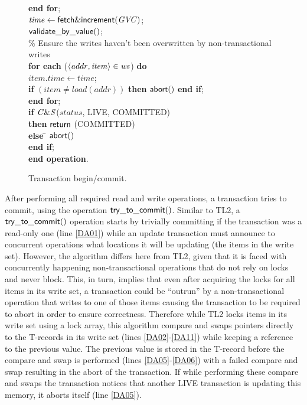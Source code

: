 \documentclass[11pt,letterpaper]{article}
\begin{document}
\begin{figure} [htb]
{{\begin{minipage}[t]{150mm}
\begin{tabbing}
 \> {\bf end for}; \\

 \> $\mathit{time} \gets {\sf fetch\&increment}(\mathit{GVC})$; \\

 \> ${\sf validate\_by\_value}()$;  \\


\> \% Ensure the writes haven't been overwritten by non-transactional writes \\
 \> 
{\bf for each} ($\left \langle \mathit{addr, item} \right \rangle  \in \mathit{ws}$) {\bf do} \\
 \>\> $\mathit{item.time} \gets \mathit{time}$; \\
 \>\> {\bf if} $(\mathit{item} \neq load(\mathit{addr}))$  
                 {\bf then}  
                   ${\sf abort}()$ 
                {\bf end if}; \\

 \> {\bf end for}; \\
 \> {\bf if} ${\sf \mathit{C\&S}}$($\mathit{status}$, LIVE, COMMITTED) \\
 \>\> {\bf then} \> ${\sf return}$ (COMMITTED)\\
 \> \> {\bf else} \= ${\sf abort}()$ \\
 \> {\bf end if};  \\
{\bf end operation}.

\end{tabbing}
\normalsize
\end{minipage}
}
\caption{Transaction begin/commit.}
\label{fig:tbc}
}
\end{figure}

After  performing all  required read  and write  operations,  a transaction
tries to commit, using the operation  ${\sf try\_to\_commit()}$.
Similar to TL2, a ${\sf try\_to\_commit()}$ operation 
starts by trivially committing if the transaction was a read-only one 
(line \ref{DA01}) while
an update transaction must announce to concurrent operations what locations it will be updating
(the items in the write set).
However, the algorithm  differs 
here from TL2, given that 
it is faced with concurrently happening non-transactional operations
that do not rely on locks and never block. 
This, in turn, implies 
that even after acquiring the locks for all items in its write set, 
a transaction could be {}``outrun'' by 
a non-transactional operation that writes to one of those items
causing the transaction to be required to abort in order to ensure correctness. 
Therefore while TL2 locks items in its write set using a
lock array, this algorithm compare and swaps pointers directly to the T-records
in its write set (lines \ref{DA02}-\ref{DA11}) while keeping a reference to the previous value.
The previous value is stored in the T-record before the compare and swap is performed (lines \ref{DA05}-\ref{DA06})
with a failed compare and swap resulting in the abort of the transaction.
If while performing these compare and swaps the transaction notices
that another LIVE transaction is updating this memory, it aborts itself
(line \ref{DA05}).
\end{document}
